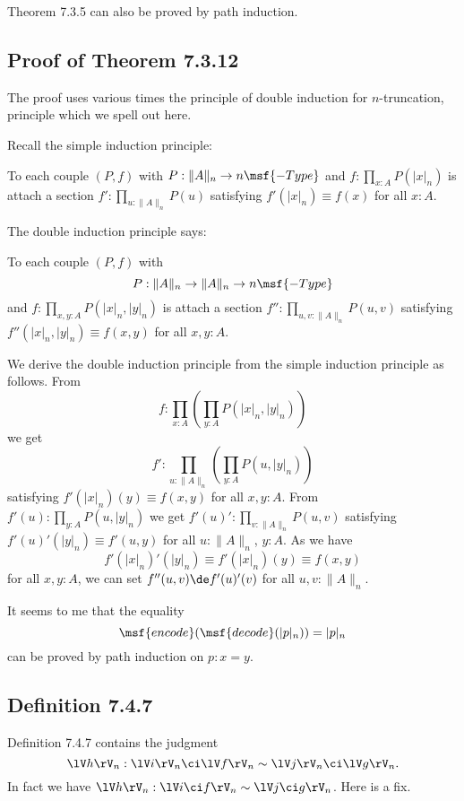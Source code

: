 \documentclass[12pt]{article}
\begin{document}
Theorem 7.3.5 can also be proved by path induction.


\subsection{Proof of Theorem 7.3.12}

The proof uses various times the principle of double induction for $n$-truncation, principle which we spell out here.

Recall the simple induction principle:

To each couple $(P,f)$ with $P:\lVert A\rVert_n\to n\msf{-Type}$ and $f:\prod_{x:A}P(\lvert x\rvert_n)$ is attach a section $f':\prod_{u:\lVert A\rVert_n}P(u)$ satisfying $f'(\lvert x\rvert_n)\equiv f(x)$ for all $x:A$.

The double induction principle says:

To each couple $(P,f)$ with $$P:\lVert A\rVert_n\to\lVert A\rVert_n\to n\msf{-Type}$$ and $f:\prod_{x,y:A}P(\lvert x\rvert_n,\lvert y\rvert_n)$ is attach a section $f'':\prod_{u,v:\lVert A\rVert_n}P(u,v)$ satisfying $f''(\lvert x\rvert_n,\lvert y\rvert_n)\equiv f(x,y)$ for all $x,y:A$.

We derive the double induction principle from the simple induction principle as follows. From 
$$
f:\prod_{x:A}\left(\prod_{y:A}P(\lvert x\rvert_n,\lvert y\rvert_n)\right)
$$ 
we get 
$$
f':\prod_{u:\lVert A\rVert_n}\left(\prod_{y:A}P(u,\lvert y\rvert_n)\right)
$$ 
satisfying $f'(\lvert x\rvert_n)(y)\equiv f(x,y)$ for all $x,y:A$. From $f'(u):\prod_{y:A}P(u,\lvert y\rvert_n)$ we get $f'(u)':\prod_{v:\lVert A\rVert_n}P(u,v)$ satisfying $f'(u)'(\lvert y\rvert_n)\equiv f'(u,y)$ for all $u:\lVert A\rVert_n$, $y:A$. As we have 
$$
f'(\lvert x\rvert_n)'(\lvert y\rvert_n)\equiv f'(\lvert x\rvert_n)(y)\equiv f(x,y) 
$$ 
for all $x,y:A$, we can set $f''(u,v)\de f'(u)'(v)$ for all $u,v:\lVert A\rVert_n$. 

It seems to me that the equality 
$$
\msf{encode}(\msf{decode}(\lvert p\rvert_n))=\lvert p\rvert_n
$$ 
can be proved by path induction on $p:x=y$.


\subsection{Definition 7.4.7}\label{747}

Definition 7.4.7 contains the judgment 
$$
\lV h\rV_n:\lV i\rV_n\ci\lV f\rV_n\sim\lV j\rV_n\ci\lV g\rV_n.
$$ 
In fact we have $\lV h\rV_n:\lV i\ci f\rV_n\sim\lV j\ci g\rV_n$. Here is a fix. 
\end{document}
